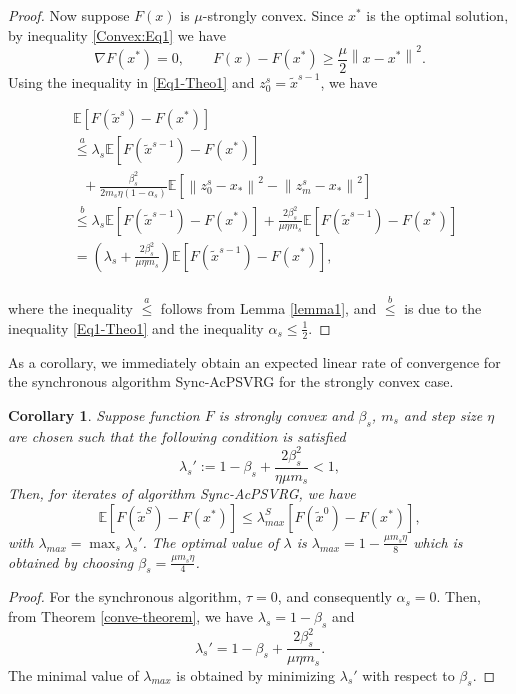 \documentclass[conference]{IEEEtran}
\newcommand*{\E}{\mathbb{E}}
\newcommand{\norm}[1]{\left\lVert#1\right\rVert}
\newtheorem{corollary}[theorem]{Corollary}
\theoremstyle{definition}
\theoremstyle{remark}
\begin{document}
\begin{proof}
Now suppose $F(x)$ is $\mu$-strongly convex. Since $x^*$ is the optimal solution, by inequality \eqref{Convex:Eq1} we have 
\begin{equation}\label{Eq1-Theo1}
\nabla F(x^*) = 0,\qquad F(x)-F(x^*) \geq \frac{\mu}{2} \norm{x-x^*}^2.
\end{equation}
Using the inequality in \eqref{Eq1-Theo1} and $z_0^s = \widetilde{x}^{s-1}$, we have 

\begin{equation}
\begin{split}
&\E [F(\widetilde{x}^s)-F(x^*)]\\
&\stackrel{a}{\leq}\lambda_s\E[F(\widetilde{x}^{s-1})-F(x^*)]\\
&~~~+ {\frac{ \beta_s^2}{2 m_s\eta(1-\alpha_s)}}\E[\norm{z_{0}^s-x_*}^2-\norm{z_{m}^s-x_*}^2]\\
&\stackrel{b}{\leq}\lambda_s\E[F(\widetilde{x}^{s-1})-F(x^*)]+ {\frac{2  \beta_s^2}{\mu\eta m_s}}\E[F(\widetilde{x}^{s-1})-F(x^*)]\\
&=(\lambda_s+{\frac{2  \beta_s^2}{\mu\eta m_s}})\E[F(\widetilde{x}^{s-1})-F(x^*)],
\end{split}
\end{equation}\\
where the inequality $\stackrel{a}{\leq}$ follows from Lemma \ref{lemma1}, and $\stackrel{b}{\leq}$ is due to the inequality \eqref{Eq1-Theo1} and the inequality $\alpha_s\leq \frac{1}{2}$. 
\end{proof}
As a corollary, we immediately obtain an expected linear rate of convergence for the synchronous algorithm Sync-AcPSVRG for the strongly convex case.
\begin{corollary}
Suppose function $F$ is strongly convex and $\beta_s$, $m_s$ and step size $\eta$ are chosen
such that the following condition is satisfied
\[
\lambda_s' := 1-\beta_s+{\frac{2\beta_s^2}{\eta\mu m_s}} < 1,
\]
Then, for iterates of algorithm Sync-AcPSVRG, we have
\begin{equation}
\E\left[F(\widetilde{x}^S)-F(x^*)\right]\leq \lambda_{max}^S\left[F(\widetilde{x}^0)-F(x^*)\right], 
\end{equation}
with $\lambda_{max} = \max_{s}{\lambda_s'}$. The optimal value of $\lambda$ is $\lambda_{max} = 1-\frac{\mu m_s\eta}{8}$ which is obtained by choosing ${\beta_s=\frac{\mu m_s\eta}{4}}$.
\end{corollary}
\begin{proof}
For the synchronous algorithm, $\tau=0$, and consequently $\alpha_s=0$. Then, from Theorem \ref{conve-theorem}, we have $\lambda_s = 1-\beta_s$ and 
\[
\lambda_s' = 1-\beta_s+{\frac{2  \beta_s^2}{\mu\eta m_s}}.\]
The minimal value of $\lambda_{max}$ is obtained by minimizing $\lambda_s'$ with respect to $\beta_s$.
\end{proof}
\end{document}
